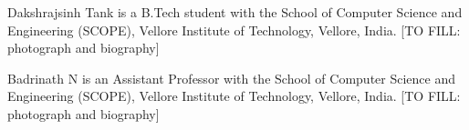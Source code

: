 \documentclass[journal]{IEEEtran}
\begin{document}
\begin{IEEEbiographynophoto}{Dakshrajsinh Tank}
is a B.Tech student with the School of Computer Science and Engineering (SCOPE), Vellore
Institute of Technology, Vellore, India. [TO FILL: photograph and biography]
\end{IEEEbiographynophoto}

\begin{IEEEbiographynophoto}{Badrinath N}
is an Assistant Professor with the School of Computer Science and Engineering (SCOPE), Vellore
Institute of Technology, Vellore, India. [TO FILL: photograph and biography]
\end{IEEEbiographynophoto}
\end{document}
